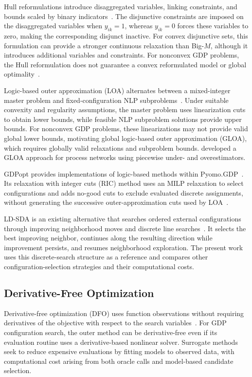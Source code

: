 \documentclass{article}
\begin{document}
Hull reformulations introduce disaggregated variables, linking constraints, and bounds scaled by binary indicators~\cite{grossmann2003hull}. 
The disjunctive constraints are imposed on the disaggregated variables when \(y_{ik}=1\), whereas \(y_{ik}=0\) forces these variables to zero, making the corresponding disjunct inactive. 
For convex disjunctive sets, this formulation can provide a stronger continuous relaxation than Big-\(M\), although it introduces additional variables and constraints. 
For nonconvex GDP problems, the Hull reformulation does not guarantee a convex reformulated model or global optimality~\cite{chen2022pyomogdp}.

Logic-based outer approximation (LOA) alternates between a mixed-integer master problem and fixed-configuration NLP subproblems~\cite{turkay1996logic}. 
Under suitable convexity and regularity assumptions, the master problem uses linearization cuts to obtain lower bounds, while feasible NLP subproblem solutions provide upper bounds. 
For nonconvex GDP problems, these linearizations may not provide valid global lower bounds, motivating global logic-based outer approximation (GLOA), which requires globally valid relaxations and subproblem bounds. 
\textcite{bergamini2005logic} developed a GLOA approach for process networks using piecewise under- and overestimators.

GDPopt provides implementations of logic-based methods within Pyomo.GDP~\cite{chen2022pyomogdp,pyomoGDPopt}. 
Its relaxation with integer cuts (RIC) method uses an MILP relaxation to select configurations and adds no-good cuts to exclude evaluated discrete assignments, without generating the successive outer-approximation cuts used by LOA~\cite{pyomoGDPopt}.

LD-SDA is an existing alternative that searches ordered external configurations through improving neighborhood moves and discrete line searches~\cite{ovalle2025logic}. 
It selects the best improving neighbor, continues along the resulting direction while improvement persists, and resumes neighborhood exploration. 
The present work uses this discrete-search structure as a reference and compares other configuration-selection strategies and their computational costs.

\subsection{Derivative-Free Optimization}

Derivative-free optimization (DFO) uses function observations without requiring derivatives of the objective with respect to the search variables~\cite{larson2019derivative}. 
For GDP configuration search, the outer method can be derivative-free even if its evaluation routine uses a derivative-based nonlinear solver. 
Surrogate methods seek to reduce expensive evaluations by fitting models to observed data, with computational cost arising from both oracle calls and model-based candidate selection. 
\end{document}
